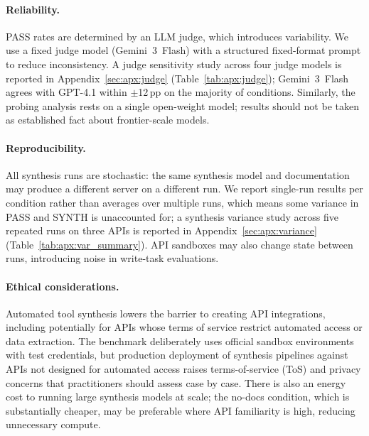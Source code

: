 \paragraph{Reliability.}
PASS rates are determined by an LLM judge, which introduces variability. We use a fixed judge model (Gemini~3~Flash) with a structured fixed-format prompt to reduce inconsistency. A judge sensitivity study across four judge models is reported in Appendix~\ref{sec:apx:judge} (Table~\ref{tab:apx:judge}); Gemini~3~Flash agrees with GPT-4.1 within $\pm$12\,pp on the majority of conditions. Similarly, the probing analysis rests on a single open-weight model; results should not be taken as established fact about frontier-scale models.

\paragraph{Reproducibility.}
All synthesis runs are stochastic: the same synthesis model and documentation may produce a different server on a different run. We report single-run results per condition rather than averages over multiple runs, which means some variance in PASS and SYNTH is unaccounted for; a synthesis variance study across five repeated runs on three APIs is reported in Appendix~\ref{sec:apx:variance} (Table~\ref{tab:apx:var_summary}). API sandboxes may also change state between runs, introducing noise in write-task evaluations.

\paragraph{Ethical considerations.}
Automated tool synthesis lowers the barrier to creating API integrations, including potentially for APIs whose terms of service restrict automated access or data extraction. The benchmark deliberately uses official sandbox environments with test credentials, but production deployment of synthesis pipelines against APIs not designed for automated access raises terms-of-service (ToS) and privacy concerns that practitioners should assess case by case. There is also an energy cost to running large synthesis models at scale; the no-docs condition, which is substantially cheaper, may be preferable where API familiarity is high, reducing unnecessary compute.